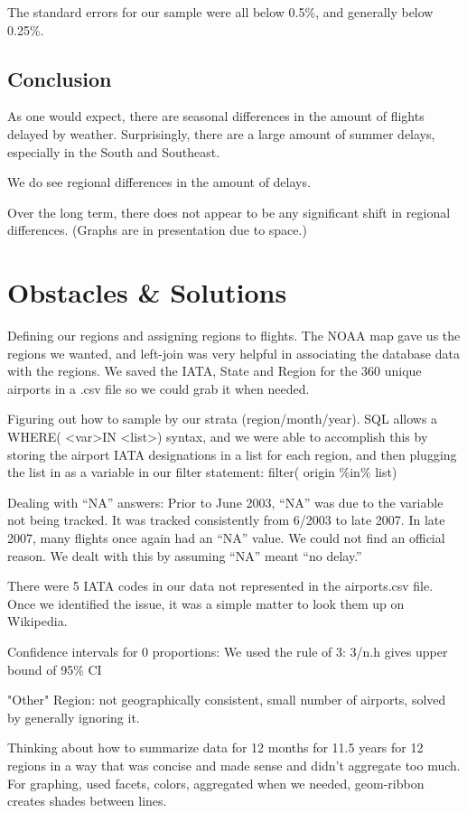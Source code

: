 \documentclass{article}
\begin{document}
\begin{multicols}{2}
The standard errors for our sample were all below 0.5\%, and generally below 0.25\%.

\subsection{Conclusion}
As one would expect, there are seasonal differences in the amount of flights delayed by weather. Surprisingly, there are a large amount of summer delays, especially in the South and Southeast. 

We do see regional differences in the amount of delays. 

Over the long term, there does not appear to be any significant shift in regional differences. (Graphs are in presentation due to space.)

\section{Obstacles \& Solutions}
Defining our regions and assigning regions to flights. The NOAA map gave us the regions we wanted, and left-join was very helpful in associating the database data with the regions. We saved the IATA, State and Region for the 360 unique airports in a .csv file so we could grab it when needed.

Figuring out how to sample by our strata (region/month/year). SQL allows a WHERE( \textless var\textgreater  IN \textless list\textgreater) syntax, and we were able to accomplish this by storing the airport IATA designations in a list for each region, and then plugging the list in as a variable in our filter statement: filter( origin \%in\% list)

Dealing with ``NA'' answers: Prior to June 2003, ``NA'' was due to the variable not being tracked. It was tracked consistently from 6/2003 to late 2007. In late 2007, many flights once again had an ``NA'' value. We could not find an official reason. We dealt with this by assuming ``NA'' meant ``no delay.''

There were 5 IATA codes in our data not represented in the airports.csv file. Once we identified the issue, it was a simple matter to look them up on Wikipedia. 

Confidence intervals for 0 proportions: We used the rule of 3: 3/n.h gives upper bound of 95\% CI

"Other" Region: not geographically consistent, small number of airports, solved by generally ignoring it.

Thinking about how to summarize data for 12 months for 11.5 years for 12 regions in a way that was concise and made sense and didn't aggregate too much. For graphing, used facets, colors, aggregated when we needed, geom-ribbon creates shades between lines.
\end{multicols}
\end{document}
